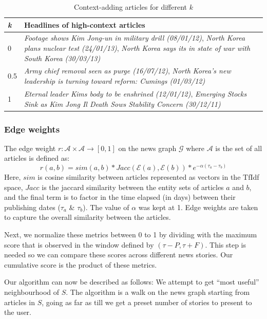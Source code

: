 \begin{table}
\small
\begin{tabular}{|l|p{7cm}|}
\hline
{\bf {\em k}} & {\bf Headlines of high-context articles}\\
\hline
0 & {\em Footage shows Kim Jong-un in military drill (08/01/12)}, {\em North Korea plans nuclear test (24/01/13)}, {\em North Korea says its in state of war with South Korea (30/03/13)}\\
\hline
0.5 & {\em Army chief removal seen as purge (16/07/12)}, {\em North Korea's new leadership is turning toward reform: Cumings (01/03/12)}\\
\hline
1 & {\em Eternal leader Kims body to be enshrined (12/01/12)}, {\em Emerging Stocks Sink as Kim Jong Il Death Sows Stability Concern (30/12/11)}\\
\hline
\end{tabular}
\caption{Context-adding articles for different $k$}
\label{tab:different-contexts}
\end{table}

\subsubsection*{Edge weights}
\label{subsec:edge_weight}
The edge weight $r:\mathcal{A} \times \mathcal{A} \rightarrow [0,1]$ on the news graph $\mathcal{G}$ where $\mathcal{A}$ is the set of all articles is defined as:
\begin{equation}
r(a, b) = sim(a,b) * Jacc(\mathcal{E}(a), \mathcal{E}(b)) * e^{-\alpha(\tau_a - \tau_b)}
\end{equation}
Here, $sim$ is cosine similarity between articles represented as vectors in the TfIdf space, $Jacc$ is the jaccard similarity between
the entity sets of articles $a$ and $b$, and the final term is to factor in the time elapsed (in days) between their publishing dates ($\tau_a$ \& $\tau_b$).
The value of $\alpha$ was kept at 1. Edge weights are taken to capture the overall similarity between the articles.

Next, we normalize these metrics between 0 to 1 by dividing with the maximum score that is observed in the window defined by $(\tau - P, \tau + F)$. This
step is needed so we can compare these scores across different news stories. Our cumulative score is the product of these metrics.

Our algorithm can now be described as follows: We attempt to get ``most useful'' neighbourhood of $S$. The algorithm is a walk on the news graph starting from articles in $S$, 
going as far as till we get a preset number of stories to present to the user.

